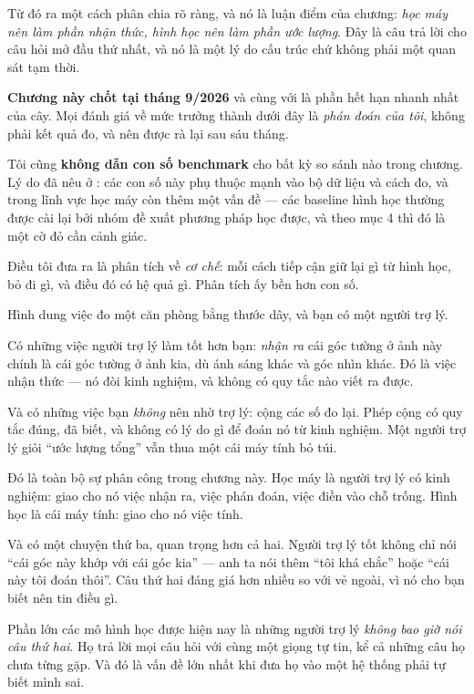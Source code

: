 \documentclass[../../vslam.tex]{subfiles}
\begin{document}
Từ đó ra một cách phân chia rõ ràng, và nó là luận điểm của chương: \emph{học máy nên làm phần nhận thức, hình học nên làm phần ước lượng}. Đây là câu trả lời cho câu hỏi mở đầu thứ nhất, và nó là một lý do cấu trúc chứ không phải một quan sát tạm thời.

\begin{cambay}
\textbf{Chương này chốt tại tháng 9/2026} và cùng với  là phần hết hạn nhanh nhất của cây. Mọi đánh giá về mức trưởng thành dưới đây là \emph{phán đoán của tôi}, không phải kết quả đo, và nên được rà lại sau sáu tháng.

Tôi cũng \textbf{không dẫn con số benchmark} cho bất kỳ so sánh nào trong chương. Lý do đã nêu ở : các con số này phụ thuộc mạnh vào bộ dữ liệu và cách đo, và trong lĩnh vực học máy còn thêm một vấn đề --- các baseline hình học thường được cài lại bởi nhóm đề xuất phương pháp học được, và theo  mục 4 thì đó là một cờ đỏ cần cảnh giác.

Điều tôi đưa ra là phân tích về \emph{cơ chế}: mỗi cách tiếp cận giữ lại gì từ hình học, bỏ đi gì, và điều đó có hệ quả gì. Phân tích ấy bền hơn con số.
\end{cambay}

\begin{trucgiac}
Hình dung việc đo một căn phòng bằng thước dây, và bạn có một người trợ lý.

Có những việc người trợ lý làm tốt hơn bạn: \emph{nhận ra} cái góc tường ở ảnh này chính là cái góc tường ở ảnh kia, dù ánh sáng khác và góc nhìn khác. Đó là việc nhận thức --- nó đòi kinh nghiệm, và không có quy tắc nào viết ra được.

Và có những việc bạn \emph{không} nên nhờ trợ lý: cộng các số đo lại. Phép cộng có quy tắc đúng, đã biết, và không có lý do gì để đoán nó từ kinh nghiệm. Một người trợ lý giỏi ``ước lượng tổng'' vẫn thua một cái máy tính bỏ túi.

Đó là toàn bộ sự phân công trong chương này. Học máy là người trợ lý có kinh nghiệm: giao cho nó việc nhận ra, việc phán đoán, việc điền vào chỗ trống. Hình học là cái máy tính: giao cho nó việc tính.

Và có một chuyện thứ ba, quan trọng hơn cả hai. Người trợ lý tốt không chỉ nói ``cái góc này khớp với cái góc kia'' --- anh ta nói thêm ``tôi khá chắc'' hoặc ``cái này tôi đoán thôi''. Câu thứ hai đáng giá hơn nhiều so với vẻ ngoài, vì nó cho bạn biết nên tin điều gì.

Phần lớn các mô hình học được hiện nay là những người trợ lý \emph{không bao giờ nói câu thứ hai}. Họ trả lời mọi câu hỏi với cùng một giọng tự tin, kể cả những câu họ chưa từng gặp. Và đó là vấn đề lớn nhất khi đưa họ vào một hệ thống phải tự biết mình sai.
\end{trucgiac}
\end{document}
